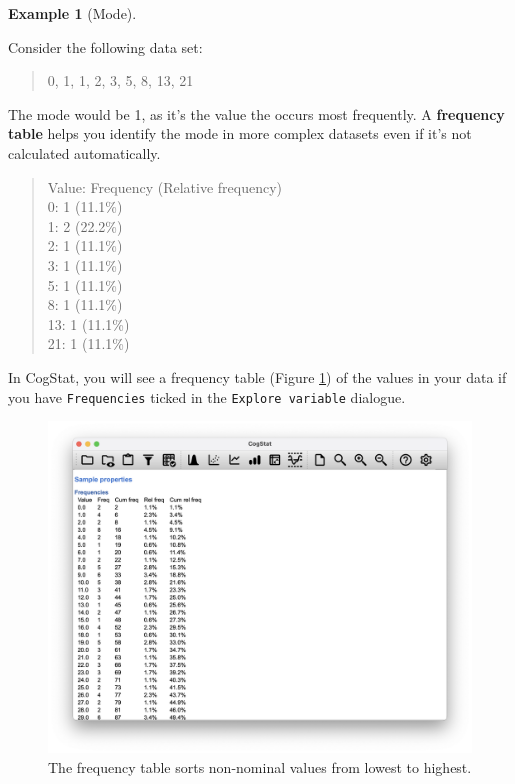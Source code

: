 \documentclass[
  11pt,
]{book}
\theoremstyle{definition}
\theoremstyle{definition}
\newtheorem{example}{Example}[chapter]
\theoremstyle{definition}
\theoremstyle{definition}
\theoremstyle{remark}
\begin{document}
\begin{example}[Mode]
\protect\hypertarget{exm:exmode}{}\label{exm:exmode}

Consider the following data set:

\begin{quote}
0, 1, 1, 2, 3, 5, 8, 13, 21
\end{quote}

The mode would be 1, as it's the value the occurs most frequently. A \textbf{frequency table} helps you identify the mode in more complex datasets even if it's not calculated automatically.

\begin{quote}
Value: Frequency (Relative frequency)\\
0: 1 (11.1\%)\\
1: 2 (22.2\%)\\
2: 1 (11.1\%)\\
3: 1 (11.1\%)\\
5: 1 (11.1\%)\\
8: 1 (11.1\%)\\
13: 1 (11.1\%)\\
21: 1 (11.1\%)\\
\end{quote}

\end{example}

In CogStat, you will see a frequency table (Figure \ref{fig:freqaflsmall}) of the values in your data if you have \texttt{Frequencies} ticked in the \texttt{Explore\ variable} dialogue.

\begin{figure}

{\centering \includegraphics[width=0.66\linewidth]{resources/image/cogstatfrequencyaflsmall} 

}

\caption{The frequency table sorts non-nominal values from lowest to highest.}\label{fig:freqaflsmall}
\end{figure}
\end{document}

